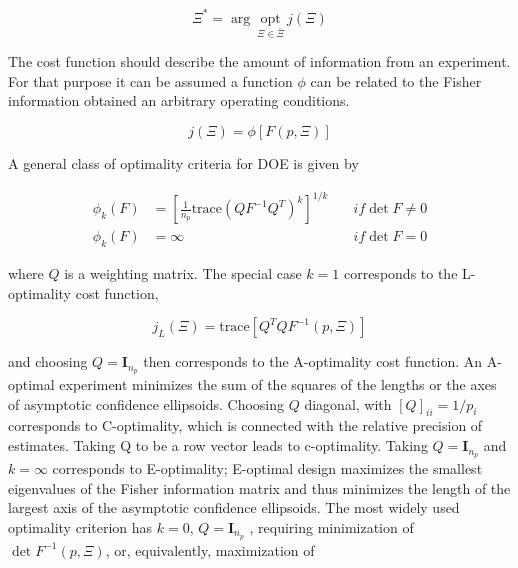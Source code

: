 \documentclass[]{scrartcl}
\begin{document}
\begin{equation}
	\Xi^* = \arg~\underset{\Xi \in \bar{\Xi}}{\text{opt}}~j\left(\Xi\right)
\end{equation}

The cost function should describe the amount of information from an experiment. For that purpose it can be assumed a function $\phi$ can be related to the Fisher information obtained an arbitrary operating conditions.

\begin{equation}
	j(\Xi) = \phi\left[ F(p, \Xi) \right]
\end{equation}


A general class of optimality criteria for DOE is given by

\begin{align}
	\phi_k(F) &= \left[\frac{1}{n_p} \text{trace}\left( QF^{-1}Q^T \right)^k \right]^{1/k} \quad &if \det F \neq 0 \nonumber \\
	\phi_k(F) &= \infty \quad &if \det F = 0
\end{align}

where $Q$ is a weighting matrix. The special case $k = 1$ corresponds to the L-optimality cost function,

\begin{equation}
	j_L(\Xi) = \text{trace} \left[ Q^TQF^{-1}(p,\Xi) \right]
\end{equation}

and choosing $Q = \textbf{I}_{n_p}$ then corresponds to the A-optimality cost function. An A-optimal experiment minimizes the sum of the squares of the lengths or the axes of asymptotic confidence ellipsoids. Choosing $Q$ diagonal, with $[Q]_{ii} = 1/p_i$ corresponds to C-optimality, which is connected with the relative precision of estimates. Taking Q to be a row vector leads to c-optimality. Taking $Q = \textbf{I}_{n_p}$ and $k = \infty$ corresponds to E-optimality; E-optimal design maximizes the smallest eigenvalues of the Fisher information matrix and thus minimizes the length of the largest axis of the asymptotic confidence ellipsoids. The most widely used optimality criterion has $k = 0$, $Q = \textbf{I}_{n_p}$ , requiring minimization of $\det F^{-1}(p, \Xi)$, or, equivalently, maximization of
\end{document}
